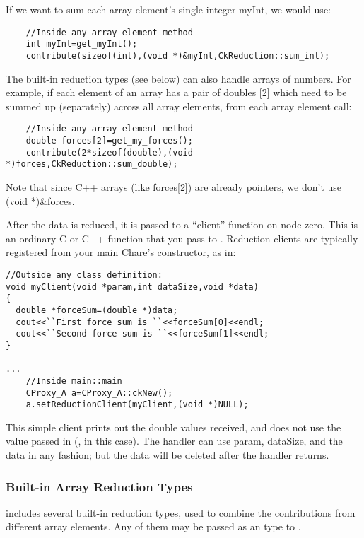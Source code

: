 If we want to sum each array element's single integer myInt, we would use:
\begin{verbatim}
    //Inside any array element method
    int myInt=get_myInt();
    contribute(sizeof(int),(void *)&myInt,CkReduction::sum_int);
\end{verbatim}

The built-in reduction types (see below) can also handle arrays of numbers.  For example, if each element of an array has a pair of doubles [2] which need to be summed up (separately) across all array elements, from each array element call:
\begin{verbatim}
    //Inside any array element method
    double forces[2]=get_my_forces();
    contribute(2*sizeof(double),(void *)forces,CkReduction::sum_double);
\end{verbatim}
Note that since C++ arrays (like forces[2]) are already pointers, we don't use (void *)\&forces.


After the data is reduced, it is passed to a ``client'' function on node zero.  This is an ordinary C or C++ function that you pass to .  Reduction clients are typically registered from your main Chare's constructor, as in:

\begin{verbatim}
//Outside any class definition:
void myClient(void *param,int dataSize,void *data)
{
  double *forceSum=(double *)data;
  cout<<``First force sum is ``<<forceSum[0]<<endl;
  cout<<``Second force sum is ``<<forceSum[1]<<endl;
}

...
    //Inside main::main
    CProxy_A a=CProxy_A::ckNew();
    a.setReductionClient(myClient,(void *)NULL);
\end{verbatim}

This simple client prints out the double values received, and does not use the  value passed in (, in this case).  The handler can use param, dataSize, and the data in any fashion; but the data will be deleted after the handler returns.


\subsubsection{Built-in Array Reduction Types}
\charmpp includes several built-in reduction types, used to combine the contributions from different array elements.  Any of them may be passed as an  type to .

